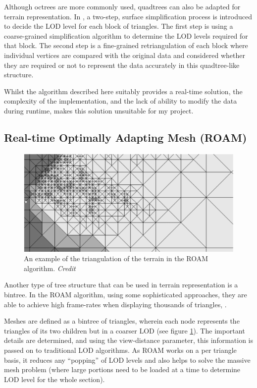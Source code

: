 \documentclass[notitlepage,12pt]{article}
\begin{document}
Although octrees are more commonly used, quadtrees can also be adapted for terrain representation. In \cite{quadtrees}, a two-step, surface simplification process is introduced to decide the LOD level for each block of triangles. The first step is using a coarse-grained simplification algorithm to determine the LOD levels required for that block. The second step is a fine-grained retriangulation of each block where individual vertices are compared with the original data and considered whether they are required or not to represent the data accurately in this quadtree-like structure.

Whilst the algorithm described here suitably provides a real-time solution, the complexity of the implementation, and the lack of ability to modify the data during runtime, makes this solution unsuitable for my project.

\subsection{Real-time Optimally Adapting Mesh (ROAM)}

\begin{figure}[h]
  \centering
  \includegraphics[width=1.0\textwidth]{roam.png}
  \caption{An example of the triangulation of the terrain in the ROAM algorithm. \textit{Credit \cite{roam}}}
  \label{fig:roam}
\end{figure}

Another type of tree structure that can be used in terrain representation is a bintree. In the ROAM algorithm, using some sophisticated approaches, they are able to achieve high frame-rates when displaying thousands of triangles, \cite{roam}. 

Meshes are defined as a bintree of triangles, wherein each node represents the triangles of its two children but in a coarser LOD (see figure \ref{fig:roam}). The important details are determined, and using the view-distance parameter, this information is passed on to traditional LOD algorithms. As ROAM works on a per triangle basis, it reduces any ``popping'' of LOD levels and also helps to solve the massive mesh problem (where large portions need to be loaded at a time to determine LOD level for the whole section).
\end{document}

